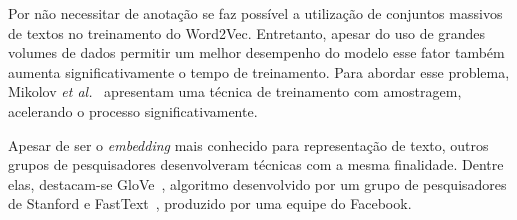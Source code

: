 Por não necessitar de anotação se faz possível a utilização de conjuntos massivos de textos no treinamento do Word2Vec.
Entretanto, apesar do uso de grandes volumes de dados permitir um melhor desempenho do modelo esse fator também aumenta
significativamente o tempo de treinamento.
Para abordar esse problema, Mikolov \textit{et al.}~\cite{mikolov13b} apresentam uma técnica de treinamento com
amostragem, acelerando o processo significativamente.

Apesar de ser o \textit{embedding} mais conhecido para representação de texto, outros grupos de pesquisadores
desenvolveram técnicas com a mesma finalidade.
Dentre elas, destacam-se GloVe~\cite{pennington14}, algoritmo desenvolvido por um grupo de pesquisadores de Stanford e
FastText~\cite{bojanowski16}, produzido por uma equipe do Facebook.
